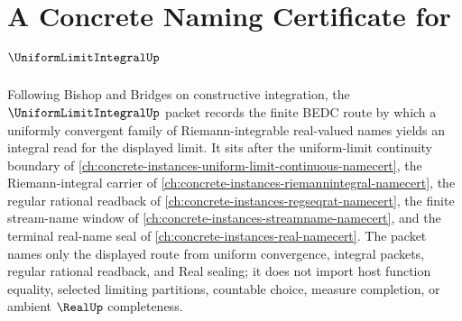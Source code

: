 \chapter{A Concrete Naming Certificate for $\UniformLimitIntegralUp$}
\label{ch:concrete-instances-uniform-limit-integral-namecert}

Following Bishop and Bridges on constructive integration, the $\UniformLimitIntegralUp$ packet records the finite BEDC route by which a uniformly convergent family of Riemann-integrable real-valued names yields an integral read for the displayed limit. It sits after the uniform-limit continuity boundary of \autoref{ch:concrete-instances-uniform-limit-continuous-namecert}, the Riemann-integral carrier of \autoref{ch:concrete-instances-riemannintegral-namecert}, the regular rational readback of \autoref{ch:concrete-instances-regseqrat-namecert}, the finite stream-name window of \autoref{ch:concrete-instances-streamname-namecert}, and the terminal real-name seal of \autoref{ch:concrete-instances-real-namecert}. The packet names only the displayed route from uniform convergence, integral packets, regular rational readback, and Real sealing; it does not import host function equality, selected limiting partitions, countable choice, measure completion, or ambient $\RealUp$ completeness.

